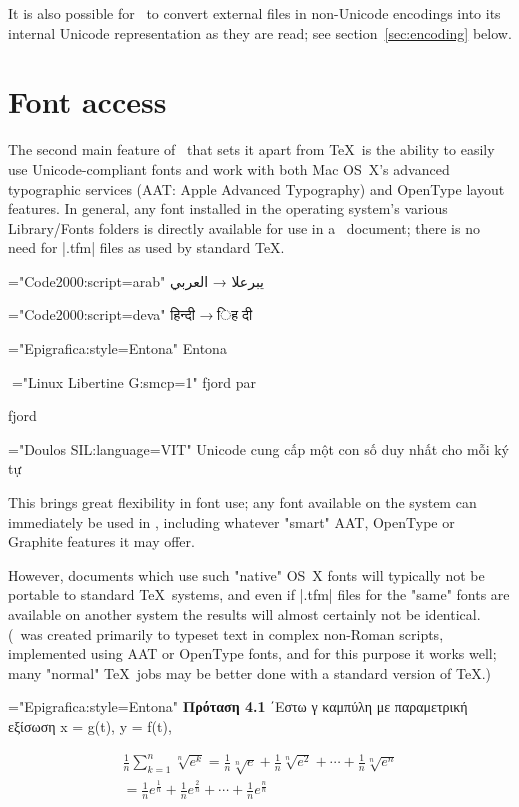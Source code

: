It is also possible for \XeTeX\ to convert external files in non-Unicode encodings into its internal Unicode representation as they are read; see section~\ref{sec:encoding} below.

\section{Font access}

The second main feature of \XeTeX\ that sets it apart from \TeX\ is the ability to easily use Unicode-compliant fonts and work with both Mac OS~X's advanced typographic services (AAT: Apple Advanced Typography) and OpenType layout features. In general, any font installed in the operating system's various Library/Fonts folders is directly available for use in a \XeTeX\ document; there is no need for |.tfm| files as used by standard \TeX.

\begin{codeexample}[vbox]{}
\bgroup
 \font\x="Code2000:script=arab" \x  يبرعلا → العربي
 \par

 \font\x="Code2000:script=deva" \x हिन्दी → िहदी \par

 \font\x="Epigrafica:style=Entona" \x Entona\par

 ^^A\font\x="Linux Libertine G:smcp=1" \x fjord par

  fjord\par

 \font\DoulosViet="Doulos SIL:language=VIT" \DoulosViet 
 Unicode cung cấp một con số duy nhất
 cho mỗi ký tự
\egroup
\end{codeexample}

This brings great flexibility in font use; any font available on the system can immediately be used in \XeTeX, including whatever "smart" AAT, OpenType or Graphite features it may offer.

However, documents which use such "native" OS~X fonts will typically not be portable to standard \TeX\ systems, and even if |.tfm| files for the "same" fonts are available on another system the results will almost certainly not be identical. (\XeTeX\ was created primarily to typeset text in complex non-Roman scripts, implemented using AAT or OpenType fonts, and for this purpose it works well; many "normal" \TeX\ jobs may be better done with a standard version of \TeX.)

\begin{codeexample}[vbox]
{
\font\x="Epigrafica:style=Entona" \x
\textbf{Πρόταση 4.1} ΄Εστω γ καμπύλη με παραμετρική εξίσωση x = g(t), y = f(t),

\begin{eqnarray}\frac{1}{n}\sum_{k=1}^{n}\sqrt[n]{e^k} =
\frac{1}{n}\sqrt[n]{e}+\frac{1}{n}\sqrt[n]{e^2}+\cdots +
\frac{1}{n}\sqrt[n]{e^n}\nonumber\\
=\frac{1}{n}e^{\frac{1}{n}}+\frac{1}{n}e^{\frac{2}{n}}+\cdots+\frac{1}{n}e^{\frac{n}{n}}\nonumber
\end{eqnarray}
}
\end{codeexample}





